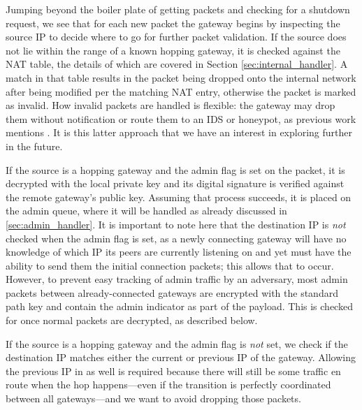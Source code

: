 \par Jumping beyond the boiler plate of getting packets and checking for a shutdown request, we see that for each new packet the gateway begins by inspecting the source IP to decide where to go for further packet validation. If the source does not lie within the range of a known hopping gateway, it is checked against the NAT table, the details of which are covered in Section \ref{sec:internal_handler}. A match in that table results in the packet being dropped onto the internal network after being modified per the matching NAT entry, otherwise the packet is marked as invalid. How invalid packets are handled is flexible: the gateway may drop them without notification or route them to an IDS \cite{NAH} or honeypot, as previous work mentions \cite{SandiaDynat, HopProactiveDef}. It is this latter approach that we have an interest in exploring further in the future.

\par If the source is a hopping gateway and the admin flag is set on the packet, it is decrypted with the local private key and its digital signature is verified against the remote gateway's public key. Assuming that process succeeds, it is placed on the admin queue, where it will be handled as already discussed in \ref{sec:admin_handler}. It is important to note here that the destination IP is \textit{not} checked when the admin flag is set, as a newly connecting gateway will have no knowledge of which IP its peers are currently listening on and yet must have the ability to send them the initial connection packets; this allows that to occur. However, to prevent easy tracking of admin traffic by an adversary, most admin packets between already-connected gateways are encrypted with the standard path key and contain the admin indicator as part of the payload. This is checked for once normal packets are decrypted, as described below.

\par If the source is a hopping gateway and the admin flag is \textit{not} set, we check if the destination IP matches either the current or previous IP of the gateway. Allowing the previous IP in as well is required because there will still be some traffic en route when the hop happens---even if the transition is perfectly coordinated between all gateways---and we want to avoid dropping those packets.

